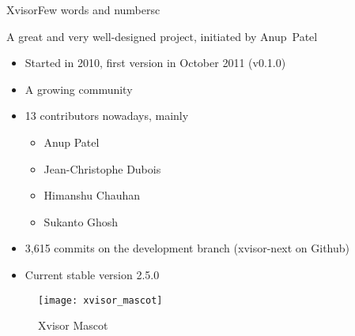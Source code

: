 \documentclass[english,slidetop,9pt,aspectratio=169]{beamer}
\begin{document}
  \begin{myframe}[1]{Xvisor}{Few words and numbers}{c}
    \begin{minipage}{0.54\textwidth}
      A great and very well-designed project, initiated by \mbox{Anup Patel}
      \begin{itemize}
      \item Started in 2010, first version in October 2011 (v0.1.0)
      \item A growing community
      \item 13 contributors nowadays, mainly
        \begin{itemize}
        \item Anup Patel
        \item Jean-Christophe Dubois
        \item Himanshu Chauhan
        \item Sukanto Ghosh
        \end{itemize}
      \item 3,615 commits on the development branch (xvisor-next on Github)
      \item Current stable version 2.5.0
      \end{itemize}
    \end{minipage}
    \begin{minipage}{0.45\textwidth}
      \begin{figure}[h!]
        \centering
        \texttt{[image: xvisor\_mascot]}
        \caption{Xvisor Mascot}
      \end{figure}
    \end{minipage}
  \end{myframe}
\end{document}
